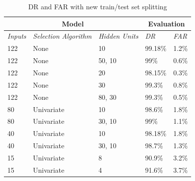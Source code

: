 \begin{table}[h]
\center
\begin{tabular}{|l|l|l||l|l|}
\hline
\multicolumn{3}{|c||}{\textbf{Model}}                                   & \multicolumn{2}{c|}{\textbf{Evaluation}} \\ \hline
\textit{Inputs} & \textit{Selection Algorithm} & \textit{Hidden Units} & \textit{DR}    & \textit{FAR}    \\ \hline
122             & None                         & 10                    &   99.18\%                  &   1.2\%                 \\ \hline
122             & None                         & 50, 10               &     99\%                &  0.6\%                 \\ \hline
122             & None                         & 20                    &    98.15\%                 &   0.3\%                 \\ \hline
122             & None                         & 30                    &    99.3\%                 &   0.8\%                 \\ \hline
122             & None                         & 80, 30               &   99.3\%                  &    0.5\%                \\ \hline  \hline
80             & Univariate                         & 10                    &   98.6\%                  &   1.8\%                 \\ \hline
80             & Univariate                         & 30, 10               &     99\%                &   1.1\%                 \\ \hline
40             & Univariate                         & 10                    &    98.18\%                 &   1.8\%                 \\ \hline
40             & Univariate                         & 30, 10               &   98.7\%                  &    1.3\%                \\ \hline
15             & Univariate                         & 8                &    90.9\%                 &      3.2\%              \\ \hline
15             & Univariate                         & 4                &    91.6\%                 &          3.7\%          \\ \hline
\end{tabular}
\caption{DR and FAR with new train/test set splitting}
\label{tab:porcata}
\end{table}